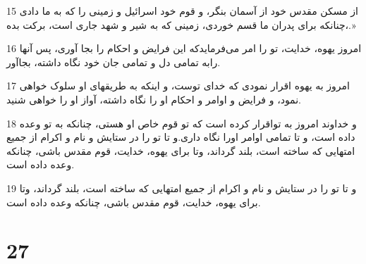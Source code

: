 \par 15 از مسکن مقدس خود از آسمان بنگر، و قوم خود اسرائیل و زمینی را که به ما دادی چنانکه برای پدران ما قسم خوردی، زمینی که به شیر و شهد جاری است، برکت بده،.»
\par 16 امروز یهوه، خدایت، تو را امر می‌فرمایدکه این فرایض و احکام را بجا آوری، پس آنها رابه تمامی دل و تمامی جان خود نگاه داشته، بجاآور.
\par 17 امروز به یهوه اقرار نمودی که خدای توست، و اینکه به طریقهای او سلوک خواهی نمود، و فرایض و اوامر و احکام او را نگاه داشته، آواز او را خواهی شنید.
\par 18 و خداوند امروز به تواقرار کرده است که تو قوم خاص او هستی، چنانکه به تو وعده داده است، و تا تمامی اوامر اورا نگاه داری.و تا تو را در ستایش و نام و اکرام از جمیع امتهایی که ساخته است، بلند گرداند، وتا برای یهوه، خدایت، قوم مقدس باشی، چنانکه وعده داده است.
\par 19 و تا تو را در ستایش و نام و اکرام از جمیع امتهایی که ساخته است، بلند گرداند، وتا برای یهوه، خدایت، قوم مقدس باشی، چنانکه وعده داده است.
 
\chapter{27}

